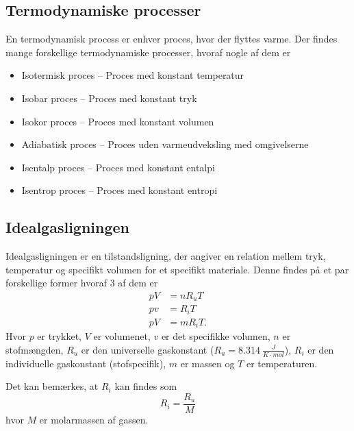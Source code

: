 
\subsection{Termodynamiske processer}
En termodynamisk process er enhver proces, hvor der flyttes varme. Der findes mange forskellige termodynamiske processer, hvoraf nogle af dem er
\begin{itemize}
  \item Isotermisk proces -- Proces med konstant temperatur
  \item Isobar proces -- Proces med konstant tryk
  \item Isokor proces -- Proces med konstant volumen
  \item Adiabatisk proces -- Proces uden varmeudveksling med omgivelserne
  \item Isentalp proces -- Proces med konstant entalpi
  \item Isentrop proces -- Proces med konstant entropi
\end{itemize}

\subsection{Idealgasligningen}
Idealgasligningen er en tilstandsligning, der angiver en relation mellem tryk, temperatur og specifikt volumen for et specifikt materiale. Denne findes på et par forskellige former hvoraf 3 af dem er
\begin{align*}
  pV &= nR_u T \\
  pv &= R_i T \\
  pV &= m R_i T
.\end{align*}
Hvor $p$ er trykket, $V$ er volumenet, $v$ er det specifikke volumen, $n$ er stofmængden, $R_u$ er den universelle gaskonstant ($R_u = \qty{8,314}{\frac{J}{K \cdot mol}}$), $R_i$ er den individuelle gaskonstant (stofspecifik), $m$ er massen og $T$ er temperaturen.

Det kan bemærkes, at $R_i$ kan findes som
\[ 
R_i = \frac{R_u}{M}
\]
hvor $M$ er molarmassen af gassen.
